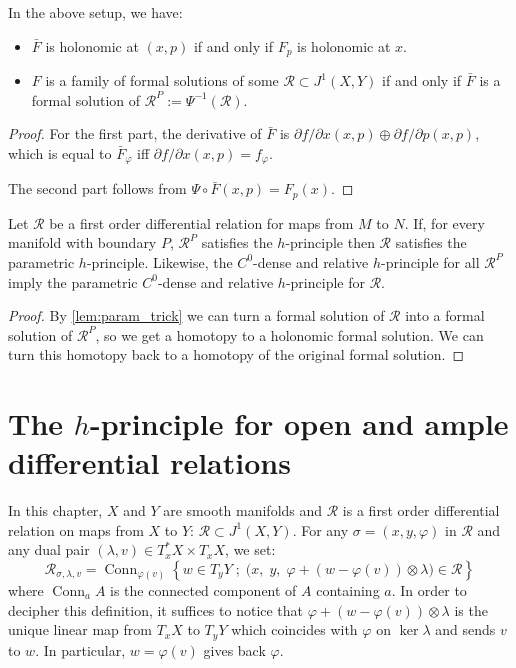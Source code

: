 \documentclass[10pt,a4paper]{article}
\newcounter{chapter}
\newcommand{\Rel}{\mathcal{R}} %
\DeclareMathOperator{\Conn}{Conn} %
\newcommand{\uses}[1]{}
\newcommand{\lean}[1]{}
\newcommand{\leanok}{}
\begin{document}
\begin{lemma}
  \label{lem:param_trick}
  \uses{def:holonomic_section, def:formal_sol}
  \leanok
  \lean{FamilyOneJetSec.isHolonomicAt_uncurry, FamilyOneJetSec.uncurry_mem_relativize}
  In the above setup, we have:
  \begin{itemize}
    \item
      $\bar F$ is holonomic at $(x, p)$ if and only if $F_p$ is holonomic
      at $x$.
    \item
      $F$ is a family of formal solutions of some $\Rel ⊂ J^1(X, Y)$ if and
      only if $\bar F$ is a formal solution of $\Rel^P := Ψ^{-1}(\Rel)$.
  \end{itemize}
\end{lemma}

\begin{proof}
  \leanok
  For the first part, the derivative of $\bar F$ is $∂f/∂x(x, p) ⊕ ∂f/∂p(x, p)$, which is equal to
  $\bar F_φ$ iff $∂f/∂x(x, p) = f_φ$.

  The second part follows from $Ψ ∘ \bar F(x,p)=F_p(x)$.
\end{proof}

\begin{lemma}
  \label{lem:param_for_free}
  \uses{def:h-princ}
  \leanok
  \lean{RelMfld.SatisfiesHPrinciple.satisfiesHPrincipleWith}
  Let $\Rel$ be a first order differential relation for maps from $M$ to
  $N$.
  If, for every manifold with boundary $P$, $\Rel^P$ satisfies the
  $h$-principle then $\Rel$ satisfies the parametric $h$-principle.
  Likewise, the $C^0$-dense and relative $h$-principle for all
  $\Rel^P$ imply the parametric $C^0$-dense and relative $h$-principle for
  $\Rel$.
\end{lemma}

\begin{proof}
  \leanok
  \uses{lem:param_trick}
  By \cref{lem:param_trick} we can turn a formal solution of $\Rel$ into a formal solution of
  $\Rel^P$, so we get a homotopy to a holonomic formal solution. We can turn this homotopy back to
  a homotopy of the original formal solution.
\end{proof}


\section{The $h$-principle for open and ample differential relations}
\label{sec:general_theory}

In this chapter, $X$ and $Y$ are smooth manifolds and $\Rel$ is a first order
differential relation on maps from $X$ to $Y$: $\Rel ⊂ J^1(X, Y)$.
For any $σ = (x, y, φ)$ in $\Rel$ and any dual pair
$(λ, v) ∈ T^*_xX × T_xX$,
we set:
\[
    \Rel_{σ, λ, v} =
     \Conn_{φ(v)}\left\{w ∈ T_yY \;;\;
       \big(x,\; y,\; φ + (w - φ(v))⊗λ\big) ∈ \Rel\right\}
\]
where $\Conn_a A$ is the connected component of $A$ containing $a$. In order to
decipher this definition, it suffices to notice that $φ + (w - φ(v))⊗λ$ is the
unique linear map from $T_xX$ to $T_yY$ which coincides with $φ$ on $\ker λ$
and sends $v$ to $w$. In particular, $w = φ(v)$ gives back $φ$.
\end{document}
